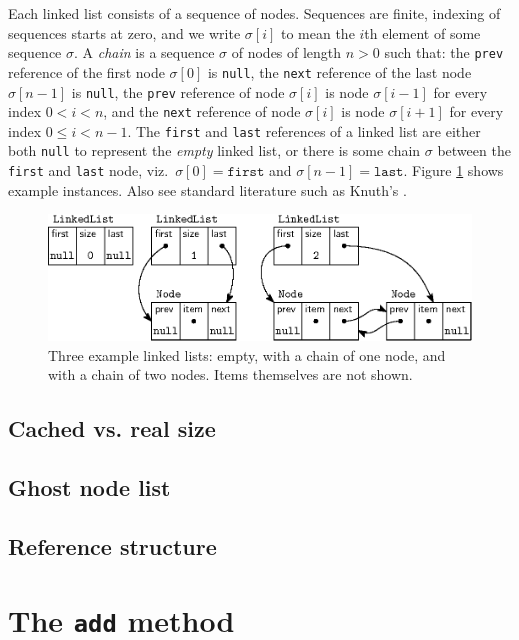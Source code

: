 \documentclass[runningheads]{llncs}
\begin{document}
Each linked list consists of a sequence of nodes. Sequences are finite, indexing of sequences starts at zero, and we write $\sigma[i]$ to mean the $i$th element of some sequence $\sigma$. A \emph{chain} is a sequence $\sigma$ of nodes of length $n>0$ such that: the \texttt{prev} reference of the first node $\sigma[0]$ is \texttt{null}, the \texttt{next} reference of the last node $\sigma[n-1]$ is \texttt{null}, the \texttt{prev} reference of node $\sigma[i]$ is node $\sigma[i-1]$ for every index $0<i<n$, and the \texttt{next} reference of node $\sigma[i]$ is node $\sigma[i+1]$ for every index $0\leq i < n-1$. The \texttt{first} and \texttt{last} references of a linked list are either both \texttt{null} to represent the \emph{empty} linked list, or there is some chain $\sigma$ between the \texttt{first} and \texttt{last} node, viz.~$\sigma[0]=\mathtt{first}$ and $\sigma[n-1]=\mathtt{last}$. Figure \ref{fig:linkedlist} shows example instances.
Also see standard literature such as Knuth's \cite[Section 2.2.5]{knuth1997art}.

\begin{figure}[t]
  \centering
  \includegraphics[scale=0.75]{figures/linkedlist1.eps}
  \caption{Three example linked lists: empty, with a chain of one node, and with a chain of two nodes. Items themselves are not shown.}
  \label{fig:linkedlist}
\end{figure}

\subsection{Cached vs. real size}
\subsection{Ghost node list}
\subsection{Reference structure}
\section{The \texttt{add} method}\label{sec:add}
\end{document}
